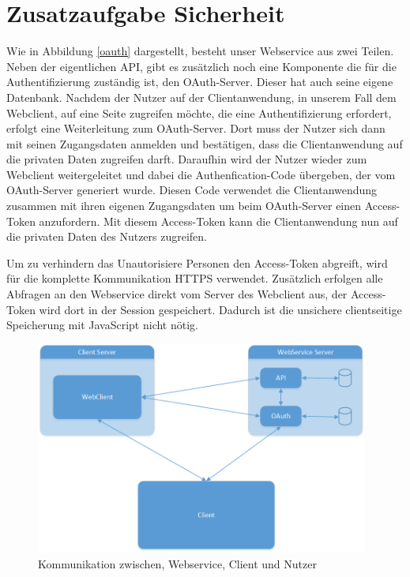 \chapter{Zusatzaufgabe Sicherheit}

Wie in Abbildung \ref{oauth} dargestellt, besteht unser Webservice aus zwei Teilen. Neben der eigentlichen API, gibt es zusätzlich noch eine Komponente die für die Authentifizierung zuständig ist, den OAuth-Server. Dieser hat auch seine eigene Datenbank. Nachdem der Nutzer auf der Clientanwendung, in unserem Fall dem Webclient, auf eine Seite zugreifen möchte, die eine Authentifizierung erfordert, erfolgt eine Weiterleitung zum OAuth-Server. Dort muss der Nutzer sich dann mit seinen Zugangsdaten anmelden und bestätigen, dass die Clientanwendung auf die privaten Daten zugreifen darft. Daraufhin wird der Nutzer wieder zum Webclient weitergeleitet und dabei die Authenfication-Code übergeben, der vom OAuth-Server generiert wurde. Diesen Code verwendet die Clientanwendung zusammen mit ihren eigenen Zugangsdaten um beim OAuth-Server einen Access-Token anzufordern. Mit diesem Access-Token kann die Clientanwendung nun auf die privaten Daten des Nutzers zugreifen.

Um zu verhindern das Unautorisiere Personen den Access-Token abgreift, wird für die komplette Kommunikation HTTPS verwendet. Zusätzlich erfolgen alle Abfragen an den Webservice direkt vom Server des Webclient aus, der Access-Token wird dort in der Session gespeichert. Dadurch ist die unsichere clientseitige Speicherung mit JavaScript nicht nötig.

\begin{figure}[h]
        \centering
	\includegraphics[height=70mm]{pics/Architektur.png}
	\caption{Kommunikation zwischen, Webservice, Client und Nutzer}
\end{figure}\label{oauth}


